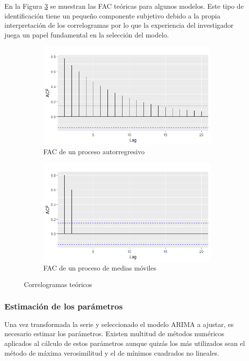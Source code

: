 En la Figura \ref{comp_acf_pacf} se muestran las FAC teóricas para algunos modelos. Este tipo de identificación tiene un pequeño componente subjetivo debido a la propia interpretación de los correlogramas por lo que la experiencia del investigador juega un papel fundamental en la selección del modelo.

\begin{figure} [t]
\begin{subfigure}{.5\textwidth}
  \centering
  \includegraphics[width=.8\linewidth]{Images/Conceptos/ar_teorico.png}
  \caption{FAC de un proceso autorregresivo}
  \label{fig:sfig1}
\end{subfigure}
\begin{subfigure}{.5\textwidth}
  \centering
  \includegraphics[width=.8\linewidth]{Images/Conceptos/ma_teorico.png}
  \caption{FAC de un proceso de medias móviles}
  \label{fig:sfig2}
\end{subfigure}
\caption{Correlogramas teóricos}
\label{comp_acf_pacf}
\end{figure}

\subsubsection{Estimación de los parámetros}
Una vez transformada la serie y seleccionado el modelo ARIMA a ajustar, es necesario estimar los parámetros. Existen multitud de métodos numéricos aplicados al cálculo de estos parámetros aunque quizás los más utilizados sean el método de máxima verosimilitud y el de mínimos cuadrados no lineales.

